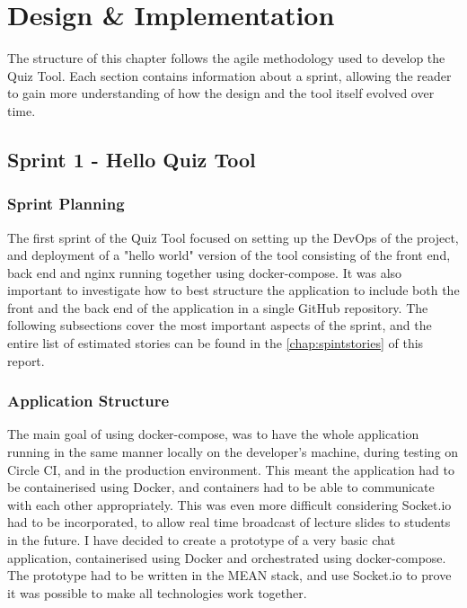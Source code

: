 \chapter{Design \& Implementation}

The structure of this chapter follows the agile methodology used to develop the
Quiz Tool. Each section contains information about a sprint, allowing the reader
to gain more understanding of how the design and the tool itself evolved over time.

\section{Sprint 1 - Hello Quiz Tool}
\subsection{Sprint Planning}
The first sprint of the Quiz Tool focused on setting up the DevOps of the project,
and deployment of a "hello world" version of the tool consisting of the front end,
back end and nginx\cite{34} running together using docker-compose. It was also important
to investigate how to best structure the application to include both the front and the
back end of the application in a single GitHub repository. The following subsections
cover the most important aspects of the sprint, and the entire list of estimated
stories can be found in the \autoref{chap:spintstories} of this report.

\subsection{Application Structure}
\label{subsection:appstructure}
The main goal of using docker-compose, was to have the whole application running in
the same manner locally on the developer's machine, during testing on Circle CI, and
in the production environment. This meant the application had to be containerised
using Docker, and containers had to be able to communicate with each other appropriately.
This was even more difficult considering Socket.io had to be incorporated, to allow
real time broadcast of lecture slides to students in the future. I have decided to
create a prototype of a very basic chat application, containerised using Docker and
orchestrated using docker-compose. The prototype had to be written in the MEAN stack,
and use Socket.io to prove it was possible to make all technologies work together.

